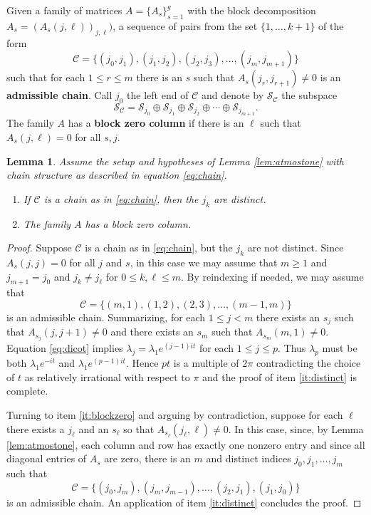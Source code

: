 \documentclass[12pt,makeidx]{amsart}
\newtheorem{lemma}[theorem]{Lemma}
\def\beq{\begin{equation}}
\def\eeq{\end{equation}}
\numberwithin{equation}{section}
\def\cC{ {\mathcal C} }
\def\cS{{\mathcal S} }
\def\cS{{\mathcal S}}
\newcommand{\df}[1]{{\bf{#1}}{\index{#1}}}
\begin{document}
 Given a family of matrices $A=\{A_s\}_{s=1}^g$ with the block decomposition $A_s=(A_s(j,\ell))_{j,\ell})$,
a  sequence of pairs from the set $\{1,\dots, k+1\}$ 
 of the form
 \beq
 \label{eq:chain}
 \cC =  \{(j_0,j_1),(j_1,j_2),(j_2,j_3),\dots, (j_m,j_{m+1}) \}
 \eeq
 such that for each $1\le r\le m$ there is an $s$ such that  $A_s(j_r,j_{r+1})\not =0$ is an \df{admissible chain}.
 Call $j_0$ the left end of $\cC$ and denote by $\cS_\cC$ the subspace
 \beq
 \label{def:cScC}
 \cS_\cC= \cS_{j_0} \oplus \cS_{j_1} \oplus \cS_{j_2} \oplus \cdots \oplus  \cS_{j_{m+1}}.
 \eeq
The family $A$ has a \df{block zero column} if there is an $\ell$ such that 
$A_s(j,\ell)=0$ for all $s,j$.


\begin{lemma}
\label{lem:zerocolumn}
Assume the setup and hypotheses of Lemma \ref{lem:atmostone} with chain structure as described in equation \eqref{eq:chain}.
\begin{enumerate}[label={\rm(\arabic*)}]
\item \label{it:distinct} If $\cC$ is a chain as in \eqref{eq:chain}, then the $j_k$ are distinct.
\item \label{it:blockzero} The family $A$ has a block zero column. 
\end{enumerate}
\end{lemma}

\begin{proof}
 Suppose $\cC$ is a chain as in \eqref{eq:chain}, but the $j_k$ are not distinct. Since $A_s(j,j)=0$ for all $j$ and $s$, in this case we may assume that $m\ge 1$ and $j_{m+1}=j_0$ and $j_k\ne j_\ell$ for $0\le k,\ell\le m$. By reindexing if needed, we may assume that
\[
 \cC =\{(m,1),(1,2),(2,3), \dots, (m-1,m)\}
\]
 is an admissible chain. Summarizing, for each  $1 \leq j <m$ there exists
an $s_j$ such that $A_{s_j} (j,j+1) \neq 0$ and there exists an $s_m$ such that
  $A_{s_m}(m,1)\ne 0$.   
 Equation \eqref{eq:dicot} implies
  $\lambda_j=\lambda_1 e^{(j-1)it}$ for each $1 \leq j \leq p.$ Thus $\lambda_p$
  must be both $\lambda_1 e^{-it}$ and $\lambda_1 e^{(p-1)it}$. Hence
 $pt$ is a multiple of $2\pi$ contradicting the choice of  $t$ as relatively irrational
with respect to $\pi$ and the proof of item \ref{it:distinct} is complete.

Turning to item \ref{it:blockzero} and  arguing by contradiction, suppose for each $\ell$ there exists
  a $j_\ell$ and an $s_\ell$ so that $A_{s_\ell} (j_\ell, \ell)\ne 0$.
  In this case,  since, by Lemma \ref{lem:atmostone}, each column and row has exactly one nonzero entry and since all diagonal
 entries of $A_s$ are zero, there is an $m$ and distinct indices $j_0,j_1,\dots,j_{m}$ such that
\[
 \cC =\{(j_0,j_{m}), (j_{m},j_{m-1}), \dots, (j_2,j_1), (j_1,j_0)\}
\]
is an admissible chain. An application of item \ref{it:distinct} concludes the proof.
\end{proof}
\end{document}
